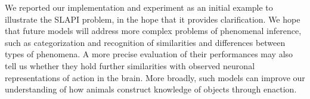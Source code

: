\documentclass[pmlr]{jmlr}%
\begin{document}
We reported our implementation and experiment as an initial example to illustrate the SLAPI problem, in the hope that it provides clarification. 
We hope that future models will address more complex problems of phenomenal inference, such as categorization and recognition of similarities and differences between types of phenomena. 
A more precise evaluation of their performances may also tell us whether they hold further similarities with observed neuronal representations of action in the brain. 
More broadly, such models can improve our understanding of how animals construct knowledge of objects through enaction. 




\end{document}
